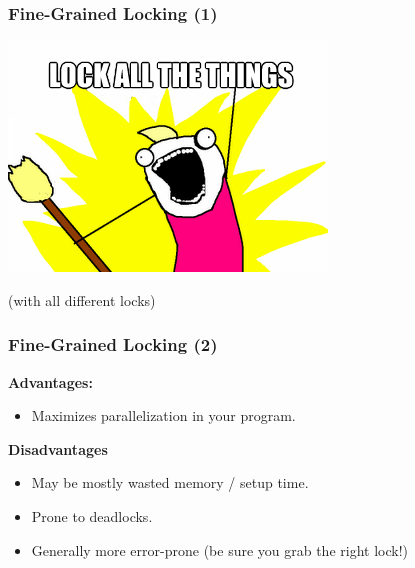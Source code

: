 \begin{frame}
  \frametitle{Fine-Grained Locking (1)}

  \begin{center}
    \includegraphics[scale=0.5]{images/lock-all-the-things}

    (with all different locks)
  \end{center}
\end{frame}

\begin{frame}
  \frametitle{Fine-Grained Locking (2)}

  
  {\bf Advantages:}
  
  \begin{itemize}
    \item Maximizes parallelization in your program.
  \end{itemize}
  \vfill
  {\bf Disadvantages}
  \begin{itemize}
    \item May be mostly wasted memory / setup time.
    \item Prone to deadlocks.
    \item Generally more error-prone (be sure you grab the right lock!)
  \end{itemize}
  
\end{frame}

